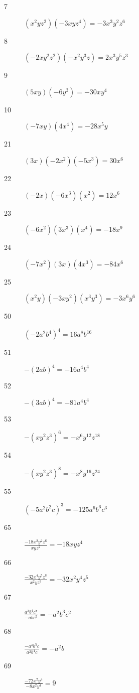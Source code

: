 \documentclass[fleqn,addpoints]{exam}
\begin{document}
\begin{description}
\item[7]
\( (x^2yz^2)(-3xyz^4) = -3x^3y^2z^6 \)

\item[8]
\( (-2xy^2z^2)(-x^2y^3z) = 2x^3y^5z^3 \)

\item[9]
\( (5xy)(-6y^3) = -30xy^4 \)

\item[10]
\( (-7xy)(4x^4) = -28x^5y \)

\item[21]
\( (3x)(-2x^2)(-5x^3) = 30x^6 \)

\item[22]
\( (-2x)(-6x^3)(x^2) = 12x^6 \)

\item[23]
\( (-6x^2)(3x^3)(x^4) = -18x^9 \)

\item[24]
\( (-7x^2)(3x)(4x^3) = -84x^6 \)

\item[25]
\( (x^2y)(-3xy^2)(x^3y^3) = -3x^6y^6 \)

\item[50]
\( (-2a^2b^4)^4 = 16a^8b^{16} \)

\item[51]
\( -(2ab)^4 = -16a^4b^4 \)

\item[52]
\( -(3ab)^4 = -81a^4b^4 \)

\item[53]
\( -(xy^2z^3)^6 = -x^6y^{12}z^{18} \)

\item[54]
\( -(xy^2z^3)^8 = -x^8y^{16}z^{24} \)

\item[55]
\( (-5a^2b^2c)^3 = -125a^6b^6c^3 \)

\item[65]
\( \displaystyle \frac{-18x^2y^2z^6}{xyz^2} = -18xyz^4\)

\item[66]
\( \displaystyle \frac{-32x^4y^5z^8}{x^2yz^3} = -32x^2y^4z^5 \)

\item[67]
\( \displaystyle \frac{a^3b^4c^7}{-abc^5} = -a^2b^3c^2 \)

\item[68]
\( \displaystyle \frac{-a^4b^5c}{a^2b^4c} = -a^2b \)

\item[69]
\( \displaystyle \frac{-72x^2y^4}{-8x^2y^4} = 9 \)


\end{description}
\end{document}
